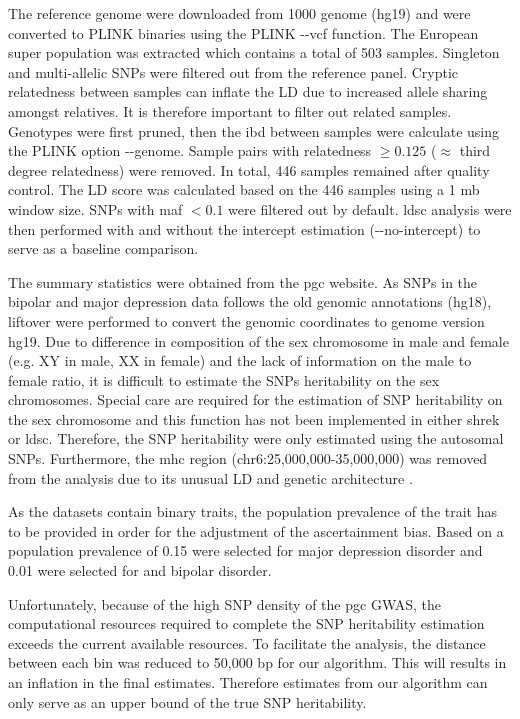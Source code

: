 	The reference genome were downloaded from 1000 genome (hg19) \citep{Project2012} and were converted to PLINK binaries using the PLINK -{}-vcf function. 
	The European super population was extracted which contains a total of 503 samples.
	Singleton and multi-allelic \glspl{SNP} were filtered out from the reference panel.	
	Cryptic relatedness between samples can inflate the \gls{LD} due to increased allele sharing amongst relatives. 
	It is therefore important to filter out related samples.
	Genotypes were first pruned, then the \gls{ibd} between samples were calculate using the PLINK option -{}-genome.
	Sample pairs with relatedness $\ge 0.125$ ($\approx$ third degree relatedness) were removed.
	In total, 446 samples remained after quality control.
	The \gls{LD} score was calculated based on the 446 samples using a 1 \gls{mb} window size.
	\glspl{SNP} with \gls{maf} $<0.1$ were filtered out by default.
	\gls{ldsc} analysis were then performed with and without the intercept estimation (-{}-no-intercept) to serve as a baseline comparison.
	
	The summary statistics were obtained from the \gls{pgc} website. 
	As \glspl{SNP} in the bipolar and major depression data follows the old genomic annotations (hg18), liftover \citep{Hinrichs2006} were performed to convert the genomic coordinates to genome version hg19.
	Due to difference in composition of the sex chromosome in male and female (e.g. XY in male, XX in female) and the lack of information on the male to female ratio, it is difficult to estimate the \glspl{SNP} heritability on the sex chromosomes.
	Special care are required for the estimation of \gls{SNP} heritability on the sex chromosome and this function has not been implemented in either \gls{shrek} or \gls{ldsc}.
	Therefore, the \gls{SNP} heritability were only estimated using the autosomal \glspl{SNP}.
	Furthermore, the \gls{mhc} region (chr6:25,000,000-35,000,000) was removed from the analysis due to its unusual \gls{LD} and genetic architecture \citep{Bulik-Sullivan2015}.
	
	
	As the datasets contain binary traits, the population prevalence of the trait has to be provided in order for the adjustment of the ascertainment bias. 
	Based on \citet{Bulik-Sullivan2015} a population prevalence of 0.15 were selected for major depression disorder and 0.01 were selected for  and bipolar disorder.
	
	Unfortunately, because of the high \gls{SNP} density of the \gls{pgc}  \gls{GWAS}, the computational resources required to complete the \gls{SNP} heritability estimation exceeds the current available resources.
	To facilitate the analysis, the distance between each bin was reduced to 50,000 \gls{bp} for our algorithm.
	This will results in an inflation in the final estimates.
	Therefore estimates from our algorithm can only serve as an upper bound of the true \gls{SNP} heritability.
	
